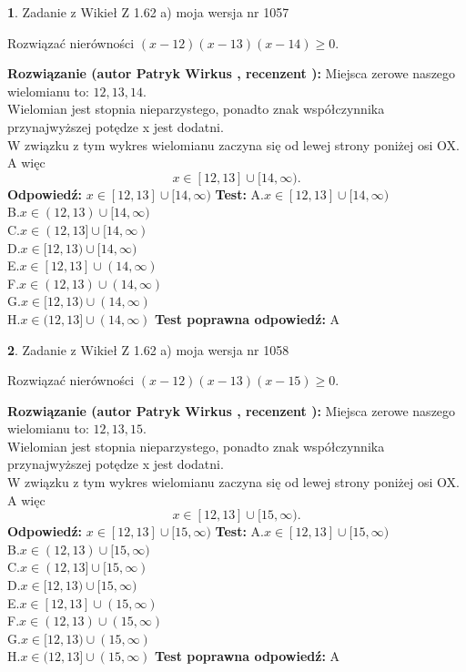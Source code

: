 \documentclass[12pt, a4paper]{article}
\theoremstyle{definition} %
\newtheorem{zad}{}
\newcommand{\zadStart}[1]{\begin{zad}#1\newline}
\newcommand{\zadStop}{\end{zad}}
\newcommand{\rozwStart}[2]{\noindent \textbf{Rozwiązanie (autor #1 , recenzent #2): }\newline}
\newcommand{\rozwStop}{\newline}
\newcommand{\odpStart}{\noindent \textbf{Odpowiedź:}\newline}
\newcommand{\odpStop}{\newline}
\newcommand{\testStart}{\noindent \textbf{Test:}\newline}
\newcommand{\testStop}{\newline}
\newcommand{\kluczStart}{\noindent \textbf{Test poprawna odpowiedź:}\newline}
\newcommand{\kluczStop}{\newline}
\begin{document}
\zadStart{Zadanie z Wikieł Z 1.62 a) moja wersja nr 1057}

Rozwiązać nierówności $(x-12)(x-13)(x-14)\ge0$.
\zadStop
\rozwStart{Patryk Wirkus}{}
Miejsca zerowe naszego wielomianu to: $12, 13, 14$.\\
Wielomian jest stopnia nieparzystego, ponadto znak współczynnika przy\linebreak najwyższej potędze x jest dodatni.\\ W związku z tym wykres wielomianu zaczyna się od lewej strony poniżej osi OX. A więc $$x \in [12,13] \cup [14,\infty).$$
\rozwStop
\odpStart
$x \in [12,13] \cup [14,\infty)$
\odpStop
\testStart
A.$x \in [12,13] \cup [14,\infty)$\\
B.$x \in (12,13) \cup [14,\infty)$\\
C.$x \in (12,13] \cup [14,\infty)$\\
D.$x \in [12,13) \cup [14,\infty)$\\
E.$x \in [12,13] \cup (14,\infty)$\\
F.$x \in (12,13) \cup (14,\infty)$\\
G.$x \in [12,13) \cup (14,\infty)$\\
H.$x \in (12,13] \cup (14,\infty)$
\testStop
\kluczStart
A
\kluczStop



\zadStart{Zadanie z Wikieł Z 1.62 a) moja wersja nr 1058}

Rozwiązać nierówności $(x-12)(x-13)(x-15)\ge0$.
\zadStop
\rozwStart{Patryk Wirkus}{}
Miejsca zerowe naszego wielomianu to: $12, 13, 15$.\\
Wielomian jest stopnia nieparzystego, ponadto znak współczynnika przy\linebreak najwyższej potędze x jest dodatni.\\ W związku z tym wykres wielomianu zaczyna się od lewej strony poniżej osi OX. A więc $$x \in [12,13] \cup [15,\infty).$$
\rozwStop
\odpStart
$x \in [12,13] \cup [15,\infty)$
\odpStop
\testStart
A.$x \in [12,13] \cup [15,\infty)$\\
B.$x \in (12,13) \cup [15,\infty)$\\
C.$x \in (12,13] \cup [15,\infty)$\\
D.$x \in [12,13) \cup [15,\infty)$\\
E.$x \in [12,13] \cup (15,\infty)$\\
F.$x \in (12,13) \cup (15,\infty)$\\
G.$x \in [12,13) \cup (15,\infty)$\\
H.$x \in (12,13] \cup (15,\infty)$
\testStop
\kluczStart
A
\kluczStop
\end{document}
